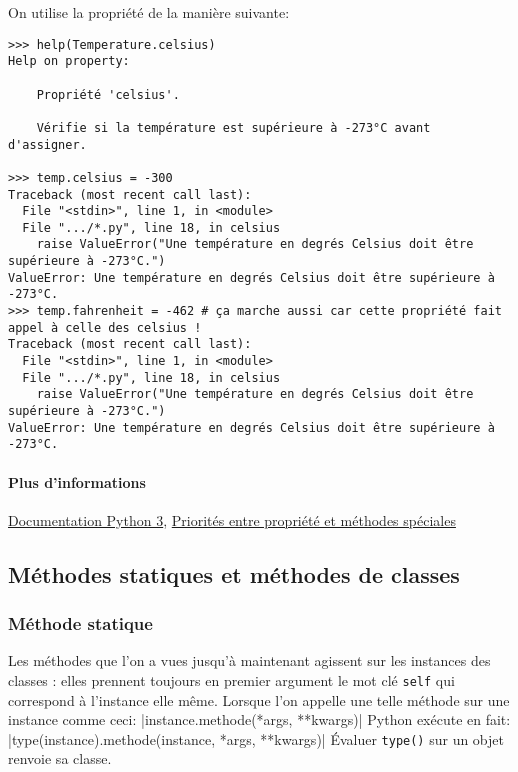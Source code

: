 On utilise la propriété de la manière suivante:
\begin{verbatim}
>>> help(Temperature.celsius)
Help on property:

    Propriété 'celsius'.
    
    Vérifie si la température est supérieure à -273°C avant d'assigner.
    
>>> temp.celsius = -300
Traceback (most recent call last):
  File "<stdin>", line 1, in <module>
  File ".../*.py", line 18, in celsius
    raise ValueError("Une température en degrés Celsius doit être supérieure à -273°C.")
ValueError: Une température en degrés Celsius doit être supérieure à -273°C.
>>> temp.fahrenheit = -462 # ça marche aussi car cette propriété fait appel à celle des celsius !
Traceback (most recent call last):
  File "<stdin>", line 1, in <module>
  File ".../*.py", line 18, in celsius
    raise ValueError("Une température en degrés Celsius doit être supérieure à -273°C.")
ValueError: Une température en degrés Celsius doit être supérieure à -273°C.
\end{verbatim}

\paragraph{Plus d'informations}\href{https://docs.python.org/fr/3/library/functions.html?highlight=property#property}{Documentation Python 3}, \href{https://stackoverflow.com/questions/15750522/class-properties-and-setattr/15751159#15751159}{Priorités entre propriété et méthodes spéciales}

\subsection{Méthodes statiques et méthodes de classes}
\subsubsection{Méthode statique}
\label{sec:staticmethod}

Les méthodes que l'on a vues jusqu'à maintenant agissent sur les instances des classes : elles prennent toujours en premier argument le mot clé \texttt{self} qui correspond à l'instance elle même. Lorsque l'on appelle une telle méthode sur une instance comme ceci:
|instance.methode(*args, **kwargs)|
Python exécute en fait: |type(instance).methode(instance, *args, **kwargs)|
Évaluer \texttt{type()} sur un objet renvoie sa classe.\bigskip

